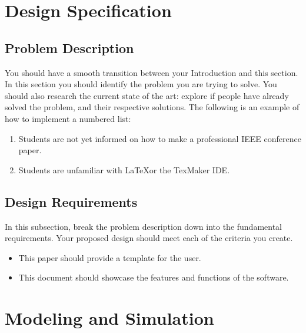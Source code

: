 \section{Design Specification}




\subsection{Problem Description}
You should have a smooth transition between your Introduction and this section. In this section you should identify the problem you are trying to solve. You should also research the current state of the art: explore if people have already solved the problem, and their respective solutions. The following is an example of how to implement a numbered list:

\begin{enumerate}
	\item Students are not yet informed on how to make a professional IEEE conference paper.
	\item Students are unfamiliar with \LaTeX  or the TexMaker IDE.
\end{enumerate}





\subsection{Design Requirements}
In this subsection, break the problem description down into the fundamental requirements. Your proposed design should meet each of the criteria you create.

\begin{itemize}
	\item This paper should provide a template for the user.
	\item This document should showcase the features and functions of the software.
\end{itemize}










\section{Modeling and Simulation}

